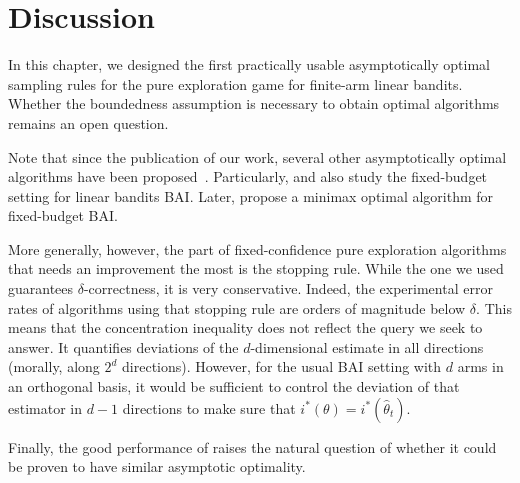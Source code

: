 \section{Discussion}\label{sec:lgc.discussion}

In this chapter, we designed the first practically usable asymptotically optimal sampling rules for the pure exploration game for finite-arm linear bandits. Whether the boundedness assumption is necessary to obtain optimal algorithms remains an open question.

Note that since the publication of our work, several other asymptotically optimal algorithms have been proposed~\citep{zaki2020linear,jedra2020linear,katz-samuels2020practical}. Particularly, \cite{jedra2020linear} and \cite{katz-samuels2020practical} also study the fixed-budget setting for linear bandits BAI. Later, \cite{yang2021linear} propose a minimax optimal algorithm for fixed-budget BAI.

More generally, however, the part of fixed-confidence pure exploration algorithms that needs an improvement the most is the stopping rule. While the one we used guarantees $\delta$-correctness, it is very conservative. Indeed, the experimental error rates of algorithms using that stopping rule are orders of magnitude below $\delta$. This means that the concentration inequality does not reflect the query we seek to answer. It quantifies deviations of the $d$-dimensional estimate in all directions (morally, along $2^d$ directions). However, for the usual BAI setting with $d$ arms in an orthogonal basis, it would be sufficient to control the deviation of that estimator in $d-1$ directions to make sure that $i^*(\theta) = i^*(\hat{\theta}_t)$.

Finally, the good performance of \LGapE raises the natural question of whether it could be proven to have similar asymptotic optimality.

